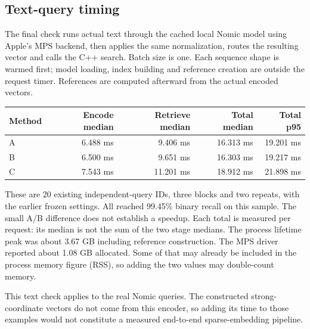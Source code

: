 \subsection{Text-query timing}
The final check runs actual text through the cached local Nomic model using Apple's MPS
backend, then applies
the same normalization, routes the resulting vector and calls the C++ search. Batch size is
one. Each sequence shape is warmed first; model loading, index building and reference creation
are outside the request timer. References are computed afterward from the actual encoded vectors.

\begin{center}\small
\begin{tabular}{@{}lrrrr@{}}\toprule
Method & Encode median & Retrieve median & Total median & Total p95\\\midrule
A & 6.488 ms & 9.406 ms & 16.313 ms & 19.201 ms\\
B & 6.500 ms & 9.651 ms & 16.303 ms & 19.217 ms\\
C & 7.543 ms & 11.201 ms & 18.912 ms & 21.898 ms\\\bottomrule
\end{tabular}\normalsize\end{center}
These are 20 existing independent-query IDs, three blocks and two repeats, with the earlier
frozen settings. All reached 99.45\% binary recall on this sample. The small A/B difference does
not establish a speedup. Each total is measured per request: its median is not the sum of the
two stage medians. The process lifetime peak was about 3.67 GB including reference construction.
The MPS driver reported about 1.08 GB allocated. Some of that may already be included in
the process memory figure (RSS), so adding the two values may double-count memory.

This text check applies to the real Nomic queries. The constructed strong-coordinate vectors
do not come from this encoder, so adding its time to those examples would not constitute a
measured end-to-end sparse-embedding pipeline.
